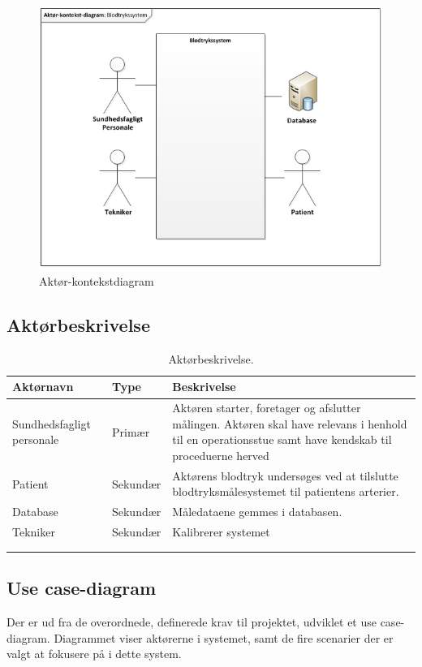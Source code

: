 \begin{figure}[H]
\centering
\includegraphics[scale=0.90]{ak.PNG}
\caption{Aktør-kontekstdiagram}
\end{figure}

\newpage

\subsection{Aktørbeskrivelse}

\begin{longtabu} to 
    \textbf{Aktørnavn} &        \textbf{Type} &    \textbf{Beskrivelse}\\[-1ex]
    \midrule
    Sundhedsfagligt personale &    Primær &    Aktøren starter, foretager og afslutter målingen. Aktøren skal have relevans i henhold til en operationsstue samt have kendskab til proceduerne herved\\
    Patient &        Sekundær &    Aktørens blodtryk undersøges ved at tilslutte blodtryksmålesystemet til patientens arterier.\\
    Database &        Sekundær &    Måledataene gemmes i databasen.\\
    Tekniker &       Sekundær &    Kalibrerer systemet\\
    
\caption{Aktørbeskrivelse.}\\
\label{actortable}
\end{longtabu}


\subsection{Use case-diagram}
Der er ud fra de overordnede, definerede krav til projektet, udviklet et use case-diagram. Diagrammet viser aktørerne i systemet, samt de fire scenarier der er valgt at fokusere på i dette system. 

